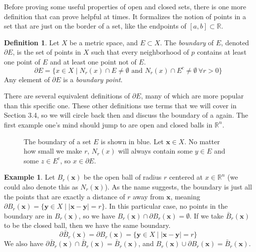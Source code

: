 \documentclass{article}
\newcommand{\R}{\mathbb{R}}
\newcommand{\x}{\mathbf{x}}
\newcommand{\y}{\mathbf{y}}
\theoremstyle{definition}
\newtheorem{definition}{Definition}[section]
\newtheorem{example}{Example}[section]
\begin{document}
Before proving some useful properties of open and closed sets, there is one more definition that can prove helpful at times. It formalizes the notion of points in a set that are just on the border of a set, like the endpoints of $ [a,b]\subset\R $.  
\begin{definition}
	Let $ X $ be a metric space, and $ E\subset X $. The \textit{\color{red}boundary} of $ E $, denoted $ \partial E $, is the set of points in $ X $ such that every neighborhood of $ p $ contains at least one point of $ E $ and at least one point not of $ E $. $$ \partial E=\{x\in X\mid N_r(x)\cap E\neq\emptyset\text{ and }N_r(x)\cap  E^c\neq\emptyset \ \forall r>0  \} $$ 
	Any element of $ \partial E $ is a \textit{\color{red}boundary point}.
\end{definition}
There are several equivalent definitions of $ \partial E $, many of which are more popular than this specific one. These other definitions use terms that we will cover in Section 3.4, so we will circle back then and discuss the boundary of a again. The first example one's mind should jump to are open and closed balls in $ \R^n $. 
  \begin{figure}[h]
  	\centering
  	\caption{The boundary of a set $ E $ is shown in blue. Let $ \x\in X $. No matter how small we make $ r $, $ N_r(x) $ will always contain some $ y\in E $ and some $ z\in E^c $, so $ x\in\partial E $. } 
  \end{figure}
\begin{example}
	Let $ B_r(\x) $ be the open ball of radius $ r $ centered at $ x\in\R^n $ (we could also denote this as $ N_r(\x) $). As the name suggests, the boundary is just all the points that are exactly a distance of $ r $ away from $ \x $, meaning $ \partial B_r(\x)=\{\y\in X\mid |\x-\y|=r\} $. In this particular case, no points in the boundary are in $ B_r(\x) $, so we have $ B_r(\x)\cap\partial B_r(\x)=\emptyset  $. If we take $ \bar{B}_r(\x) $ to be the closed ball, then we have the same boundary. $$\partial \bar{B}_r(\x)=\partial B_r(\x)=\{\y\in X\mid |\x-\y|=r\} $$ We also have $ \partial \bar{B}_r(\x)\cap \bar{B}_r(\x)=\bar{B}_r(\x)  $, and $ B_r(\x)\cup\partial B_r(\x)=\bar{B}_r(\x) $. 
\end{example}
\end{document}

